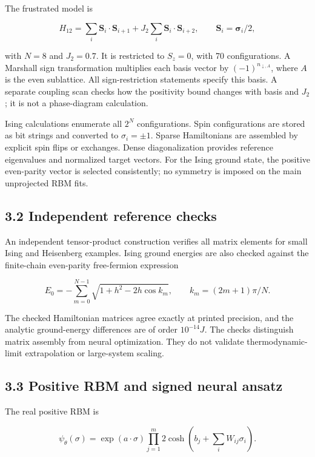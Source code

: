 \documentclass[
  11pt,
  a4paper,
]{article}
\begin{document}
The frustrated model is

\[H_{12}=\sum_i\mathbf S_i\cdot\mathbf S_{i+1}+J_2\sum_i\mathbf S_i\cdot\mathbf S_{i+2},\qquad \mathbf S_i=\boldsymbol\sigma_i/2,\]

with \(N=8\) and \(J_2=0.7\). It is restricted to \(S_z=0\), with 70
configurations. A Marshall sign transformation multiplies each basis
vector by \((-1)^{n_{\downarrow,A}}\), where \(A\) is the even
sublattice. All sign-restriction statements specify this basis. A
separate coupling scan checks how the positivity bound changes with
basis and \(J_2\); it is not a phase-diagram calculation.

Ising calculations enumerate all \(2^N\) configurations. Spin
configurations are stored as bit strings and converted to
\(\sigma_i=\pm1\). Sparse Hamiltonians are assembled by explicit spin
flips or exchanges. Dense diagonalization provides reference eigenvalues
and normalized target vectors. For the Ising ground state, the positive
even-parity vector is selected consistently; no symmetry is imposed on
the main unprojected RBM fits.

\hypertarget{independent-reference-checks}{%
\subsection{3.2 Independent reference
checks}\label{independent-reference-checks}}

An independent tensor-product construction verifies all matrix elements
for small Ising and Heisenberg examples. Ising ground energies are also
checked against the finite-chain even-parity free-fermion expression

\[E_0=-\sum_{m=0}^{N-1}\sqrt{1+h^2-2h\cos k_m},\qquad k_m=(2m+1)\pi/N.\]

The checked Hamiltonian matrices agree exactly at printed precision, and
the analytic ground-energy differences are of order \(10^{-14}J\). The
checks distinguish matrix assembly from neural optimization. They do not
validate thermodynamic-limit extrapolation or large-system scaling.

\hypertarget{positive-rbm-and-signed-neural-ansatz}{%
\subsection{3.3 Positive RBM and signed neural
ansatz}\label{positive-rbm-and-signed-neural-ansatz}}

The real positive RBM is

\[\psi_\theta(\sigma)=\exp(a\cdot\sigma)\prod_{j=1}^{m}2\cosh\left(b_j+\sum_iW_{ij}\sigma_i\right).\]
\end{document}
